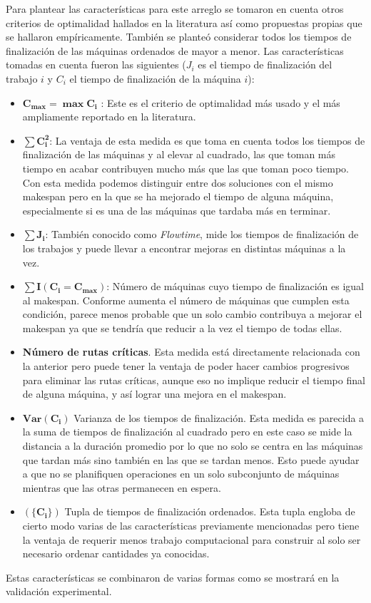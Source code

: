Para plantear las características para este arreglo se tomaron en cuenta otros criterios de optimalidad hallados en la literatura así como propuestas 
propias que se hallaron empíricamente. 
%
También se planteó considerar todos los tiempos de finalización de las máquinas ordenados de mayor a menor.
%
Las características tomadas en cuenta fueron las siguientes ($J_i$ es el tiempo de finalización del trabajo $i$ y $C_i$ el tiempo de finalización de la máquina $i$):
\begin{itemize}
    \item $\mathbf{C_{max} = \max{C_i}}$ : Este es el criterio de optimalidad más usado y el más ampliamente reportado en la literatura. 
    \item $\mathbf{\sum C_i^2}$: La ventaja de esta medida es que toma en cuenta todos los tiempos de finalización de las máquinas y al elevar al cuadrado, 
		las que toman más tiempo en acabar contribuyen mucho más que las que toman poco tiempo. Con esta medida podemos distinguir entre dos soluciones con el mismo makespan 
		pero en la que se ha mejorado el tiempo de alguna máquina, especialmente si es una de las máquinas que tardaba más en terminar.
    \item $\mathbf{\sum J_i}$: También conocido como \textit{Flowtime}, mide los tiempos de finalización de los trabajos y puede llevar a encontrar mejoras en distintas 
		máquinas a la vez.
    \item $\mathbf{\sum I(C_i=C_{max})}$: Número de máquinas cuyo tiempo de finalización es igual al makespan. Conforme aumenta el número de máquinas que cumplen esta 
		condición, parece menos probable que un solo cambio contribuya a mejorar el makespan ya que se tendría que reducir a la vez el tiempo de todas ellas. 
    \item \textbf{Número de rutas críticas}. Esta medida está directamente relacionada con la anterior pero puede tener la ventaja de poder hacer cambios progresivos 
		para eliminar las rutas críticas, aunque eso no implique reducir el tiempo final de alguna máquina, y así lograr una mejora en el makespan. 
    \item $\mathbf{Var(C_i)}$ Varianza de los tiempos de finalización. Esta medida es parecida a la suma de tiempos de finalización al cuadrado pero en este caso se 
		mide la distancia a la duración promedio por lo que no solo se centra en las máquinas que tardan más sino también en las que se tardan menos. Esto puede ayudar a 
		que no se planifiquen operaciones en un solo subconjunto de máquinas mientras que las otras permanecen en espera.
    \item $\mathbf{(\{C_i\})}$ Tupla de tiempos de finalización ordenados. Esta tupla engloba de cierto modo varias de las características previamente mencionadas pero
		tiene la ventaja de requerir menos trabajo computacional para construir al solo ser necesario ordenar cantidades ya conocidas.
\end{itemize}

Estas características se combinaron de varias formas como se mostrará en la validación experimental. 
